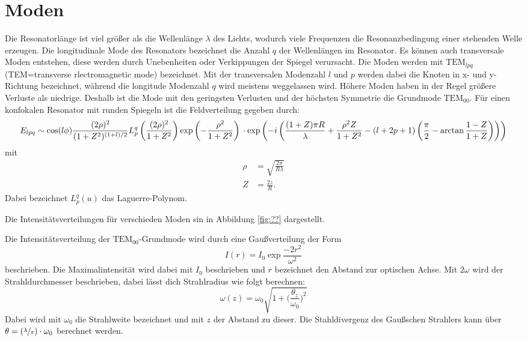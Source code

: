 \section{Moden}
Die Resonatorlänge ist viel größer als die Wellenlänge $\lambda$ des Lichts, wodurch viele Frequenzen die
Resonanzbedingung einer stehenden Welle erzeugen.
Die longitudinale Mode des Resonators bezeichnet die Anzahl $q$ der Wellenlängen im Resonator. Es können
auch transversale Moden entstehen, diese werden durch Unebenheiten oder Verkippungen der Spiegel verursacht.
Die Moden werden mit $\text{TEM}_{lpq}$ (TEM=transverse rlectromagnetic mode) bezeichnet. Mit der
transversalen Modenzahl $l$ und $p$ werden dabei die Knoten in x- und y-Richtung bezeichnet,
während die longitude Modenzahl $q$ wird meistens weggelassen wird.
Höhere Moden haben in der Regel größere Verluste als niedrige. Deshalb ist die Mode mit den geringsten
Verlusten und der höchsten Symmetrie die Grundmode $\text{TEM}_{00}$.
Für einen konfokalen Resonator mit runden Spiegeln ist die Feldverteilung gegeben durch:
\begin{equation}
  E_{lpq} \sim \cos(l\phi)\frac{(2\rho)^2}{(1+Z^2)^{(1+l)/2}}
                     L_p^q\left(\frac{(2\rho)^2}{1+Z^2}\right) \exp\left(-\frac{\rho^2}{1+Z^2}\right)\\
                   \cdot\exp\left(
                     -i\left(\frac{(1+Z)\pi R}{\lambda}+\frac{\rho^2Z}{1+Z^2}-(l+2p+1)
                     \left(\frac{\pi}{2}-\arctan\frac{1-Z}{1+Z}\right)\right)\right)
\end{equation}
mit
\begin{align}
  \rho &= \sqrt{\frac{2\pi}{R\lambda}} \\
  Z &= \frac{2z}{R}.
\end{align}
Dabei bezeichnet $L_p^q(u)$ das Laguerre-Polynom.

Die Intensitätsverteilungen für verschieden Moden sin in Abbildung \ref{fig:??} dargestellt.

Die Intensitätsverteilung der $\text{TEM}_{00}$-Grundmode wird durch eine Gaußverteilung der Form
\begin{equation}
  I(r)=I_0\exp{\frac{-2r^2}{\omega^2}}
\end{equation}
beschrieben. Die Maximalintensität wird dabei mit $I_0$ beschrieben und $r$ bezeichnet den Abstand
zur optischen Achse. Mit $2\omega$ wird der Strahldurchmesser beschrieben, dabei lässt dich Strahlradius
wie folgt berechnen:
\begin{equation}
  \omega(z)=\omega_0\sqrt{1+\Big(\frac{\theta_z}{\omega_0}\Big)^2}
  \label{eqn:Strahlradius}
\end{equation}
Dabei wird mit $\omega_0$ die Strahlweite bezeichnet und mit $z$ der Abstand zu dieser.
Die Stahldivergenz des Gaußschen Strahlers kann über $\theta=(\sfrac{\lambda}{\pi})\cdot\omega_0$ berechnet werden.
